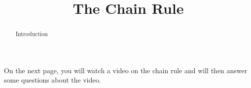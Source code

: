 \documentclass[handout]{ximera}
\title{The Chain Rule}
\begin{document}
\begin{abstract} Introduction %
\end{abstract}

\maketitle

On the next page, you will watch a video on the chain rule and will then answer some questions about the video.
\end{document}
